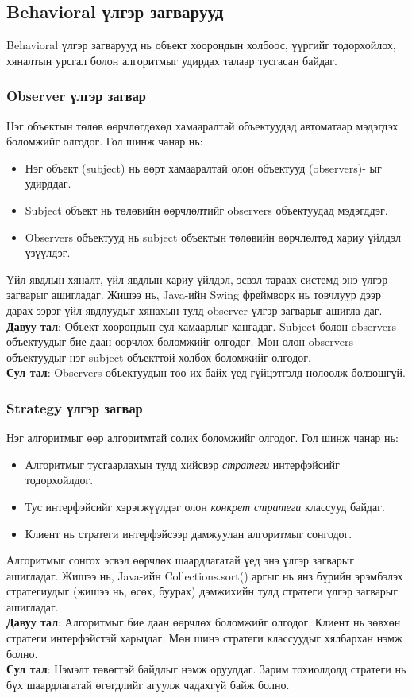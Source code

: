 \subsection{Behavioral үлгэр загварууд}
Behavioral үлгэр загварууд нь объект хоорондын холбоос, үүргийг тодорхойлох, хяналтын урсгал болон алгоритмыг удирдах талаар тусгасан байдаг.

\subsubsection{Observer үлгэр загвар}
\quad \quad Нэг объектын төлөв өөрчлөгдөхөд хамааралтай объектуудад автоматаар мэдэгдэх боломжийг олгодог. Гол шинж чанар нь:
\begin{itemize}
	\item Нэг объект (subject) нь өөрт хамааралтай олон объектууд (observers)- ыг удирддаг.
	\item Subject объект нь төлөвийн өөрчлөлтийг observers объектуудад мэдэгддэг.
	\item Observers объектууд нь subject объектын төлөвийн өөрчлөлтөд хариу үйлдэл үзүүлдэг.
\end{itemize}
Үйл явдлын хяналт, үйл явдлын хариу үйлдэл, эсвэл тараах системд энэ үлгэр загварыг ашигладаг. Жишээ нь, Java-ийн Swing фреймворк нь товчлуур дээр дарах зэрэг үйл явдлуудыг хянахын тулд observer үлгэр загварыг ашигла	даг.\\
\textbf{Давуу тал}: Объект хоорондын сул хамаарлыг хангадаг. Subject болон observers объектуудыг бие даан өөрчлөх боломжийг олгодог. Мөн олон observers объектуудыг нэг subject объекттой холбох боломжийг олгодог.\\
\textbf{Сул тал}: Observers объектуудын тоо их байх үед гүйцэтгэлд нөлөөлж болзошгүй.	

\subsubsection{Strategy үлгэр загвар}	
\quad \quad Нэг алгоритмыг өөр алгоритмтай солих боломжийг олгодог. Гол шинж чанар нь:
\begin{itemize}
	\item Алгоритмыг тусгаарлахын тулд хийсвэр \textit{стратеги} интерфэйсийг тодорхойлдог.
	\item Тус интерфэйсийг хэрэгжүүлдэг олон \textit{конкрет стратеги} классууд байдаг.
	\item Клиент нь стратеги интерфэйсээр дамжуулан алгоритмыг сонгодог.
\end{itemize}
Алгоритмыг сонгох эсвэл өөрчлөх шаардлагатай үед энэ үлгэр загварыг ашигладаг. Жишээ нь, Java-ийн Collections.sort() аргыг нь янз бүрийн эрэмбэлэх стратегиудыг (жишээ нь, өсөх, буурах) дэмжихийн тулд стратеги үлгэр загварыг ашигладаг.\\
\textbf{Давуу тал}: Алгоритмыг бие даан өөрчлөх боломжийг олгодог. Клиент нь зөвхөн стратеги интерфэйстэй харьцдаг. Мөн шинэ стратеги классуудыг хялбархан нэмж болно.\\
\textbf{Сул тал}: Нэмэлт төвөгтэй байдлыг нэмж оруулдаг. Зарим тохиолдолд стратеги нь бүх шаардлагатай өгөгдлийг агуулж чадахгүй байж болно.

